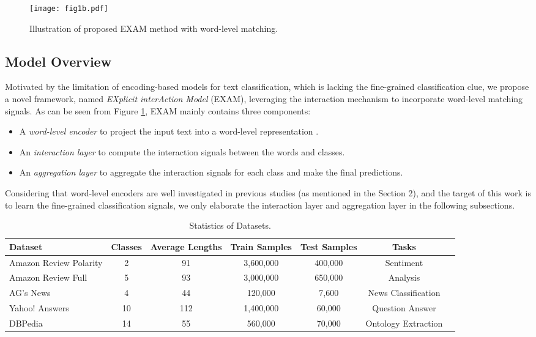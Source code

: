 \documentclass[letterpaper]{article} \usepackage{aaai19}  \usepackage{times}  \usepackage{helvet}  \usepackage{courier}  \usepackage{url}  \usepackage{graphicx}
\begin{document}
\begin{figure}[tbp] \centering  
	\texttt{[image: fig1b.pdf]}   
	\caption{Illustration of proposed EXAM method with word-level matching.} 
    	\label{exama}
\end{figure}
 
\subsection{Model Overview}
Motivated by the limitation of encoding-based models for text classification, which is lacking the fine-grained classification clue, we propose a novel framework, named \textit{EXplicit interAction Model} (EXAM), leveraging the interaction mechanism to incorporate word-level matching signals. As can be seen from Figure \ref{exama}, EXAM mainly contains three components:
\begin{itemize}
\item A \textit{word-level encoder} to project the input text  into a word-level representation .
\item An \textit{interaction layer} to compute the interaction signals between the words and classes.
\item An \textit{aggregation layer} to aggregate the interaction signals for each class and make the final predictions.
\end{itemize}

Considering that word-level encoders are well investigated in previous studies (as mentioned in the Section 2), and the target of this work is to learn the fine-grained classification signals, we only elaborate the interaction layer and aggregation layer in the following subsections.

\begin{table*}
  \caption{Statistics of Datasets.}
  \label{multi-class}
  \centering
\begin{tabular}{lcccccc}
    \toprule
    Dataset  &Classes&Average Lengths&Train Samples&Test Samples&Tasks\\
    \midrule
    Amazon Review Polarity	&2&91 	&3,600,000		&400,000& Sentiment\\
	Amazon Review Full		&5&93 		&3,000,000		&650,000&	 Analysis\\
    \midrule
	AG's News				&4&44 	&120,000		&7,600		&News Classification \\
    \midrule
	Yahoo! Answers			&10&112 &1,400,000		&60,000		&Question Answer \\
    \midrule
	DBPedia					&14&55 	&560,000		&70,000		&Ontology Extraction\\
   
    \bottomrule
  \end{tabular}
\end{table*}
\end{document}
